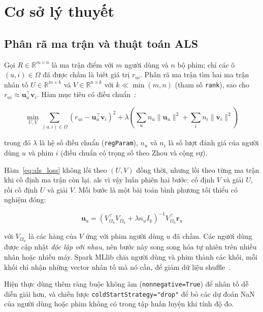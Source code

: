 \chapter{Cơ sở lý thuyết}
\label{chap:co_so}

\section{Phân rã ma trận và thuật toán ALS}
\label{sec:als}
Gọi $R \in \mathbb{R}^{m \times n}$ là ma trận điểm với $m$ người dùng và $n$ bộ phim; chỉ các ô $(u,i) \in \Omega$ đã được chấm là biết giá trị $r_{ui}$. Phân rã ma trận tìm hai ma trận nhân tố $U \in \mathbb{R}^{m \times k}$ và $V \in \mathbb{R}^{n \times k}$ với $k \ll \min(m,n)$ (tham số \texttt{rank}), sao cho $r_{ui} \approx \mathbf{u}_u^\top \mathbf{v}_i$. Hàm mục tiêu có điều chuẩn~\cite{koren2009matrix,zhou2008als}:
\begin{ctbox}
\begin{equation}
  \min_{U,V} \sum_{(u,i) \in \Omega} \left( r_{ui} - \mathbf{u}_u^\top \mathbf{v}_i \right)^2
  + \lambda \left( \sum_u n_u \lVert \mathbf{u}_u \rVert^2 + \sum_i n_i \lVert \mathbf{v}_i \rVert^2 \right)
  \label{eq:als_loss}
\end{equation}
\end{ctbox}
trong đó $\lambda$ là hệ số điều chuẩn (\texttt{regParam}), $n_u$ và $n_i$ là số lượt đánh giá của người dùng $u$ và phim $i$ (điều chuẩn có trọng số theo Zhou và cộng sự).

Hàm~\eqref{eq:als_loss} không lồi theo $(U,V)$ đồng thời, nhưng lồi theo từng ma trận khi cố định ma trận còn lại. \gls{als} vì vậy luân phiên hai bước: cố định $V$ và giải $U$, rồi cố định $U$ và giải $V$. Mỗi bước là một bài toán bình phương tối thiểu có nghiệm đóng:
\begin{ctbox}
\begin{equation}
  \mathbf{u}_u = \left( V_{\Omega_u}^\top V_{\Omega_u} + \lambda n_u I_k \right)^{-1} V_{\Omega_u}^\top \mathbf{r}_u
  \label{eq:als_update}
\end{equation}
\end{ctbox}
với $V_{\Omega_u}$ là các hàng của $V$ ứng với phim người dùng $u$ đã chấm. Các người dùng được cập nhật \emph{độc lập với nhau}, nên bước này song song hóa tự nhiên trên nhiều nhân hoặc nhiều máy. Spark MLlib chia người dùng và phim thành các khối, mỗi khối chỉ nhận những vector nhân tố mà nó cần, để giảm dữ liệu shuffle~\cite{meng2016mllib}.

Hiện thực dùng thêm ràng buộc không âm (\texttt{nonnegative=True}) để nhân tố dễ diễn giải hơn, và chiến lược \texttt{coldStartStrategy="drop"} để bỏ các dự đoán NaN của người dùng hoặc phim không có trong tập huấn luyện khi tính độ đo.

